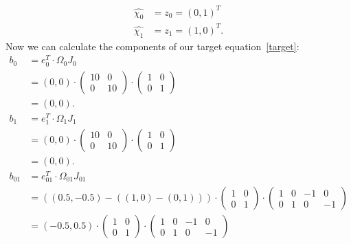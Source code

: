 \begin{align}
    \hat{\chi_0} &= z_0 = (0,1)^{T}\\
    \hat{\chi_1} &= z_1 = (1,0)^{T}.
\end{align}
Now we can calculate the components of our target equation\ \ref{target}:
\begin{align}
    b_0 &= e_0^T \cdotp \Omega_0 J_{0}\\
    &= (0,0) \cdotp \begin{pmatrix}
                        10 & 0 \\ 0 & 10
    \end{pmatrix} \cdotp \begin{pmatrix}
                             1 & 0 \\ 0 & 1
    \end{pmatrix}\\
    &= (0,0).\\
    b_1 &= e_1^T \cdotp \Omega_{1} J_{1}\\
    &= (0,0) \cdotp \begin{pmatrix}
                        10 & 0 \\ 0 & 10
    \end{pmatrix} \cdotp \begin{pmatrix}
                             1 & 0 \\ 0 & 1
    \end{pmatrix}\\
    &= (0,0).\\
    b_{01} &= e_{01}^T \cdotp \Omega_{01} J_{01}\\
    &= \left( (0.5, -0.5) - \left( (1,0) - (0,1) \right) \right)\cdotp \begin{pmatrix}
                                                                           1 & 0 \\ 0 & 1
    \end{pmatrix} \cdotp \begin{pmatrix}
                             1 & 0 & -1 & 0 \\ 0 & 1 & 0 & -1
    \end{pmatrix}\\
    &= (-0.5, 0.5)\cdotp \begin{pmatrix}
                             1 & 0 \\ 0 & 1
    \end{pmatrix} \cdotp \begin{pmatrix}
                             1 & 0 & -1 & 0 \\ 0 & 1 & 0 & -1

\end{pmatrix}
\end{align}
